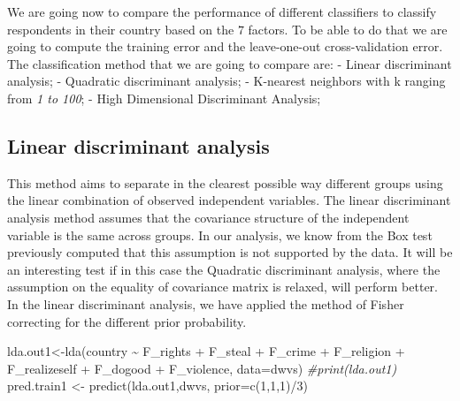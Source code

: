 \documentclass[
  11pt,
]{article}
\newenvironment{Shaded}{\begin{snugshade}}{\end{snugshade}}
\newcommand{\AttributeTok}[1]{\textcolor[rgb]{0.77,0.63,0.00}{#1}}
\newcommand{\CommentTok}[1]{\textcolor[rgb]{0.56,0.35,0.01}{\textit{#1}}}
\newcommand{\DecValTok}[1]{\textcolor[rgb]{0.00,0.00,0.81}{#1}}
\newcommand{\FunctionTok}[1]{\textcolor[rgb]{0.00,0.00,0.00}{#1}}
\newcommand{\NormalTok}[1]{#1}
\newcommand{\OtherTok}[1]{\textcolor[rgb]{0.56,0.35,0.01}{#1}}
\newcommand{\SpecialCharTok}[1]{\textcolor[rgb]{0.00,0.00,0.00}{#1}}
\begin{document}
We are going now to compare the performance of different classifiers to classify respondents in their country based on the \(7\) factors. To be able to do that we are going to compute the training error and the leave-one-out cross-validation error.
The classification method that we are going to compare are:
- Linear discriminant analysis;
- Quadratic discriminant analysis;
- K-nearest neighbors with k ranging from \emph{1 to 100};
- High Dimensional Discriminant Analysis;

\hypertarget{linear-discriminant-analysis}{%
\subsection{Linear discriminant analysis}\label{linear-discriminant-analysis}}

This method aims to separate in the clearest possible way different groups using the linear combination of observed independent variables. The linear discriminant analysis method assumes that the covariance structure of the independent variable is the same across groups. In our analysis, we know from the Box test previously computed that this assumption is not supported by the data. It will be an interesting test if in this case the Quadratic discriminant analysis, where the assumption on the equality of covariance matrix is relaxed, will perform better.
In the linear discriminant analysis, we have applied the method of Fisher correcting for the different prior probability.

\begin{Shaded}
\begin{Highlighting}[]
\NormalTok{lda.out1}\OtherTok{\textless{}{-}}\FunctionTok{lda}\NormalTok{(country }\SpecialCharTok{\textasciitilde{}}\NormalTok{ F\_rights }\SpecialCharTok{+}\NormalTok{ F\_steal }\SpecialCharTok{+}\NormalTok{ F\_crime }\SpecialCharTok{+}\NormalTok{ F\_religion }\SpecialCharTok{+}\NormalTok{ F\_realizeself }\SpecialCharTok{+}
\NormalTok{                F\_dogood }\SpecialCharTok{+}\NormalTok{ F\_violence, }\AttributeTok{data=}\NormalTok{dwvs)}
\CommentTok{\#print(lda.out1)}
\NormalTok{pred.train1 }\OtherTok{\textless{}{-}} \FunctionTok{predict}\NormalTok{(lda.out1,dwvs, }\AttributeTok{prior=}\FunctionTok{c}\NormalTok{(}\DecValTok{1}\NormalTok{,}\DecValTok{1}\NormalTok{,}\DecValTok{1}\NormalTok{)}\SpecialCharTok{/}\DecValTok{3}\NormalTok{)}
\end{Highlighting}
\end{Shaded}

\begin{Shaded}
\end{Shaded}
\end{document}
